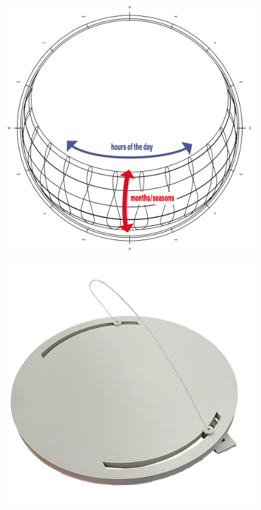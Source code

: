 \documentclass[a4paper,9pt]{article}
\begin{document}
    \begin{minipage}{0.48\linewidth}
         \begin{figure}[H]
        \centering
        \includegraphics[width=.7\linewidth]{Images/sun path coord.png}
        \label{pathcoord}
    \end{figure}
    \end{minipage}
    \hfill
    \begin{minipage}{0.48\linewidth}
         \begin{figure}[H]
        \centering
        \includegraphics[width=.7\linewidth]{Images/prototyp bending v22_1.jpg}
        \label{protobend}
    \end{figure}
    \end{minipage}
\end{document}
